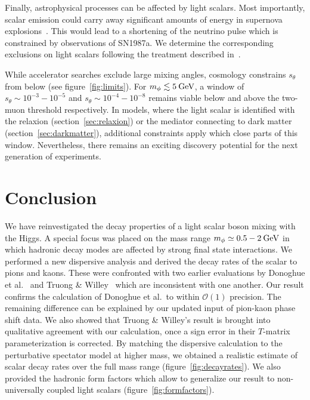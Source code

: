 \documentclass[preprintnumbers,twocolumn,aps,floats,nofootinbib]{revtex4-1}
\newcommand{\eVdist}{\kern-0.06em}
\newcommand{\gev}{\:\text{Ge\eVdist V}}
\begin{document}
Finally, astrophysical processes can be affected by light scalars. Most importantly, scalar emission could carry away significant amounts of energy in supernova explosions~\cite{Ellis:1987pk,Turner:1987by}. This would lead to a shortening of the neutrino pulse which is constrained by observations of SN1987a. We determine the corresponding exclusions on light scalars following the treatment described in~\cite{Krnjaic:2015mbs,Evans:2017kti}. 

While accelerator searches exclude large mixing angles, cosmology constrains $s_\theta$ from below (see figure~\ref{fig:limits}). For $m_\phi\lesssim 5\gev$, a window of $s_\theta\sim10^{-3}-10^{-5}$ and $s_\theta\sim10^{-4}-10^{-8}$ remains viable below and above the two-muon threshold respectively. In models, where the light scalar is identified with the relaxion (section~\ref{sec:relaxion}) or the mediator connecting to dark matter (section~\ref{sec:darkmatter}), additional constraints apply which close parts of this window. Nevertheless, there remains an exciting discovery potential for the next generation of experiments.

\section{Conclusion}
We have reinvestigated the decay properties of a light scalar boson mixing with the Higgs. A special focus was placed on the mass range $m_\phi\simeq 0.5-2\gev$ in which hadronic decay modes are affected by strong final state interactions. We performed a new dispersive analysis and derived the decay rates of the scalar to pions and kaons. These were confronted with two earlier evaluations by Donoghue et al.~\cite{Donoghue:1990xh} and Truong \& Willey~\cite{Truong:1989my} which are inconsistent with one another. Our result confirms the calculation of Donoghue et al.\ to within $\mathcal{O}(1)$ precision. The remaining difference can be explained by our updated input of pion-kaon phase shift data. We also showed that Truong \& Willey's result is brought into qualitative agreement with our calculation, once a sign error in their $T$-matrix parameterization is corrected. By matching the dispersive calculation to the perturbative spectator model at higher mass, we obtained a realistic estimate of scalar decay rates over the full mass range (figure~\ref{fig:decayrates}). We also provided the hadronic form factors which allow to generalize our result to non-universally coupled light scalars (figure~\ref{fig:formfactors}).
\end{document}
